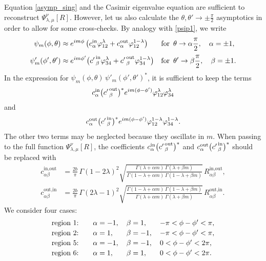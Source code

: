 \documentclass[11pt]{article}
\newcommand{\lt}{\left}
\newcommand{\rt}{\right}
\newcommand{\vp}{\varphi}
\newcommand{\IN}{\text{in}}
\newcommand{\OUT}{\text{out}}
\begin{document}
Equation \eqref{asymp_sing} and the Casimir eigenvalue equation are sufficient to reconstruct $\Psi^{\nu}_{\lambda,\mu}[R]$. However, let us also calculate the $\theta,\theta'\to\pm\frac{\pi}{2}$ asymptotics in order to allow for some cross-checks. By analogy with \eqref{psip1}, we write
\begin{equation}
\begin{aligned}
\psi_m(\phi,\theta) &\approx e^{im\phi}
\lt( c^{\IN}_{\alpha}\vp_{12}^{\lambda}
+c^{\OUT}_{\alpha}\vp_{12}^{1-\lambda} \rt)
&& \text{for }\, \theta\to\alpha\frac{\pi}{2},\quad \alpha=\pm 1,
\\[2pt]
\psi'_m(\phi',\theta') &\approx e^{im\phi'}
\bigl({c'\kern1pt}^{\IN}_{\beta}\vp_{34}^{\lambda}
+{c'\kern1pt}^{\OUT}_{\beta}\vp_{34}^{1-\lambda}\bigr)
&& \text{for }\, \theta'\to\beta\frac{\pi}{2},\quad \beta=\pm 1.
\end{aligned}
\end{equation}
In the expression for $\psi_m(\phi,\theta)\,\psi'_m(\phi',\theta')^*$, it is sufficient to keep the terms 
$$c^{\IN}_{\alpha}\bigl({c'\kern1pt}^{\OUT}_{\beta}\bigr)^{*} e^{im(\phi-\phi')} \vp_{12}^{\lambda}\vp_{34}^{\lambda}$$ 
and 
$$c^{\OUT}_{\alpha}\bigl({c'\kern1pt}^{\IN}_{\beta}\bigr)^{*} e^{im(\phi-\phi' )} \vp_{12}^{1-\lambda}\vp_{34}^{1-\lambda}.$$ 
The other two terms may be neglected because they oscillate in $m$. When passing to the full function $\Psi^{\nu}_{\lambda,\mu}[R]$, the coefficients $c^{\IN}_{\alpha} \bigl( {c'\kern1pt}^{\OUT}_{\beta} \bigr)^{*}$ and $c^{\OUT}_{\alpha} \bigl( {c'\kern1pt}^{\IN}_{\beta} \bigr)^{*}$ should be replaced with
\begin{equation}
\begin{aligned}
c^{\IN,\OUT}_{\alpha\beta} &=\frac{2b}{\pi}\,\Gamma(1-2\lambda)^2
\sqrt{\frac{\Gamma(\lambda+\alpha m)\,\Gamma(\lambda+\beta m)}
{\Gamma(1-\lambda+\alpha m)\,\Gamma(1-\lambda+\beta m)}}\,
R^{\IN,\OUT}_{\alpha\beta},\\[3pt]
c^{\OUT,\IN}_{\alpha\beta} &=\frac{2b}{\pi}\,\Gamma(2\lambda-1)^2
\sqrt{\frac{\Gamma(1-\lambda+\alpha m)\,\Gamma(1-\lambda+\beta m)}
{\Gamma(\lambda+\alpha m)\,\Gamma(\lambda+\beta m)}}\,
R^{\OUT,\IN}_{\alpha\beta}.
\end{aligned}
\end{equation}
We consider four cases:
\begin{equation}
\begin{array}{@{}l@{\qquad}l@{\quad\,}l@{\quad\,}l@{}}
\text{region $1$:} & \alpha=-1, & \beta=1, & -\pi<\phi-\phi'<\pi,\\[2pt]
\text{region $2$:} & \alpha=1, & \beta=-1, & -\pi<\phi-\phi'<\pi,\\[2pt]
\text{region $5$:} & \alpha=-1, & \beta=-1, & 0<\phi-\phi'<2\pi,\\[2pt]
\text{region $6$:} & \alpha=1, & \beta=1, & 0<\phi-\phi'<2\pi.
\end{array}
\end{equation}
\end{document}
